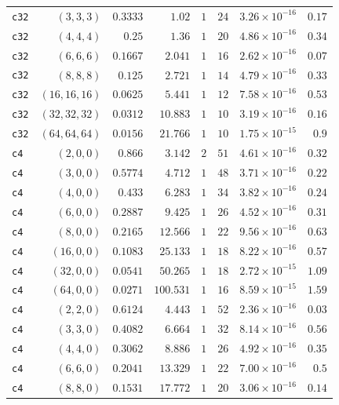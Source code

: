 \begin{longtable}{lrrrrrrr}
\texttt{c32} & $(3,3,3)$ & $0.3333$ & $1.02$ & $1$ & $24$ & $3.26{\times}10^{-16}$ & $0.17$ \\
\texttt{c32} & $(4,4,4)$ & $0.25$ & $1.36$ & $1$ & $20$ & $4.86{\times}10^{-16}$ & $0.34$ \\
\texttt{c32} & $(6,6,6)$ & $0.1667$ & $2.041$ & $1$ & $16$ & $2.62{\times}10^{-16}$ & $0.07$ \\
\texttt{c32} & $(8,8,8)$ & $0.125$ & $2.721$ & $1$ & $14$ & $4.79{\times}10^{-16}$ & $0.33$ \\
\texttt{c32} & $(16,16,16)$ & $0.0625$ & $5.441$ & $1$ & $12$ & $7.58{\times}10^{-16}$ & $0.53$ \\
\texttt{c32} & $(32,32,32)$ & $0.0312$ & $10.883$ & $1$ & $10$ & $3.19{\times}10^{-16}$ & $0.16$ \\
\texttt{c32} & $(64,64,64)$ & $0.0156$ & $21.766$ & $1$ & $10$ & $1.75{\times}10^{-15}$ & $0.9$ \\
\texttt{c4} & $(2,0,0)$ & $0.866$ & $3.142$ & $2$ & $51$ & $4.61{\times}10^{-16}$ & $0.32$ \\
\texttt{c4} & $(3,0,0)$ & $0.5774$ & $4.712$ & $1$ & $48$ & $3.71{\times}10^{-16}$ & $0.22$ \\
\texttt{c4} & $(4,0,0)$ & $0.433$ & $6.283$ & $1$ & $34$ & $3.82{\times}10^{-16}$ & $0.24$ \\
\texttt{c4} & $(6,0,0)$ & $0.2887$ & $9.425$ & $1$ & $26$ & $4.52{\times}10^{-16}$ & $0.31$ \\
\texttt{c4} & $(8,0,0)$ & $0.2165$ & $12.566$ & $1$ & $22$ & $9.56{\times}10^{-16}$ & $0.63$ \\
\texttt{c4} & $(16,0,0)$ & $0.1083$ & $25.133$ & $1$ & $18$ & $8.22{\times}10^{-16}$ & $0.57$ \\
\texttt{c4} & $(32,0,0)$ & $0.0541$ & $50.265$ & $1$ & $18$ & $2.72{\times}10^{-15}$ & $1.09$ \\
\texttt{c4} & $(64,0,0)$ & $0.0271$ & $100.531$ & $1$ & $16$ & $8.59{\times}10^{-15}$ & $1.59$ \\
\texttt{c4} & $(2,2,0)$ & $0.6124$ & $4.443$ & $1$ & $52$ & $2.36{\times}10^{-16}$ & $0.03$ \\
\texttt{c4} & $(3,3,0)$ & $0.4082$ & $6.664$ & $1$ & $32$ & $8.14{\times}10^{-16}$ & $0.56$ \\
\texttt{c4} & $(4,4,0)$ & $0.3062$ & $8.886$ & $1$ & $26$ & $4.92{\times}10^{-16}$ & $0.35$ \\
\texttt{c4} & $(6,6,0)$ & $0.2041$ & $13.329$ & $1$ & $22$ & $7.00{\times}10^{-16}$ & $0.5$ \\
\texttt{c4} & $(8,8,0)$ & $0.1531$ & $17.772$ & $1$ & $20$ & $3.06{\times}10^{-16}$ & $0.14$ \\

\end{longtable}
